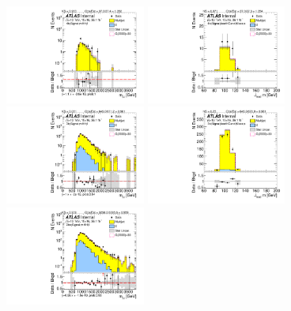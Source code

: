 \begin{figure}[htb!]
\begin{center}
\includegraphics[width=0.41\textwidth,angle=-90]{figures/boosted/ZZ/Moriond_ZZ_FourTag_Signal_mHH_l_1.pdf}
\includegraphics[width=0.41\textwidth,angle=-90]{figures/boosted/ZZ/Moriond_ZZ_FourTag_Signal_leadHCand_Mass_s.pdf}\\
\includegraphics[width=0.41\textwidth,angle=-90]{figures/boosted/ZZ/Moriond_ZZ_ThreeTag_Signal_mHH_l_1.pdf}
\includegraphics[width=0.41\textwidth,angle=-90]{figures/boosted/ZZ/Moriond_ZZ_ThreeTag_Signal_leadHCand_Mass_s.pdf}\\
\includegraphics[width=0.41\textwidth,angle=-90]{figures/boosted/ZZ/Moriond_ZZ_TwoTag_split_Signal_mHH_l_1.pdf}

\end{center}
\end{figure}
